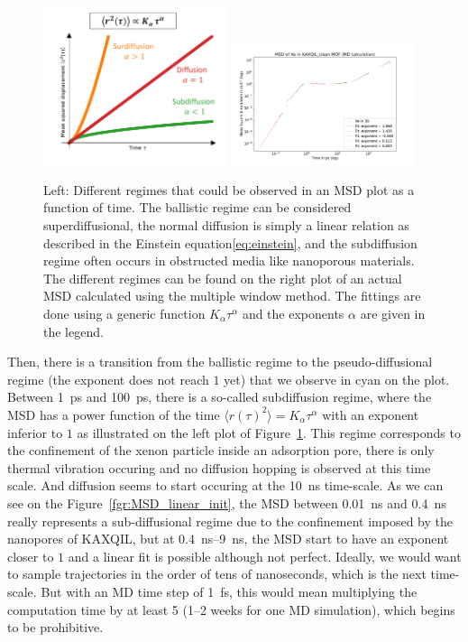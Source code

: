 \documentclass[main]{subfiles}
\begin{document}
\begin{figure}[ht]
  \centering
    \includegraphics[width=0.48\textwidth]{figures/5-diffusion/MSD_anomalous_diffusion.pdf}
    \includegraphics[width=0.48\textwidth]{figures/5-diffusion/MSD_Xe_KAXQIL_clean.pdf}
    \caption{Left: Different regimes that could be observed in an MSD plot as a function of time. The ballistic regime can be considered superdiffusional, the normal diffusion is simply a linear relation as described in the Einstein equation\ref{eq:einstein}, and the subdiffusion regime often occurs in obstructed media like nanoporous materials.  The different regimes can be found on the right plot of an actual MSD calculated using the multiple window method. The fittings are done using a generic function $K_\alpha\tau^\alpha$ and the exponents $\alpha$ are given in the legend. }\label{fgr:MSD_init}
\end{figure}

Then, there is a transition from the ballistic regime to the pseudo-diffusional regime (the exponent does not reach $1$ yet) that we observe in cyan on the plot. Between \SI{1}{\ps} and \SI{100}{\ps}, there is a so-called subdiffusion regime, where the MSD has a power function of the time $\langle {r(\tau)}^2 \rangle=K_\alpha\tau^\alpha$ with an exponent inferior to $1$ as illustrated on the left plot of Figure~\ref{fgr:MSD_init}. This regime corresponds to the confinement of the xenon particle inside an adsorption pore, there is only thermal vibration occuring and no diffusion hopping is observed at this time scale. And diffusion seems to start occuring at the \SI{10}{\ns} time-scale. As we can see on the Figure~\ref{fgr:MSD_linear_init}, the MSD between \SI{0.01}{\ns} and \SI{0.4}{\ns} really represents a sub-diffusional regime due to the confinement imposed by the nanopores of KAXQIL, but at \SI{0.4}{\ns}--\SI{9}{\ns}, the MSD start to have an exponent closer to $1$ and a linear fit is possible although not perfect. Ideally, we would want to sample trajectories in the order of tens of nanoseconds, which is the next time-scale. But with an MD time step of \SI{1}{\fs}, this would mean multiplying the computation time by at least 5 (1--2 weeks for one MD simulation), which begins to be prohibitive. 
\end{document}
